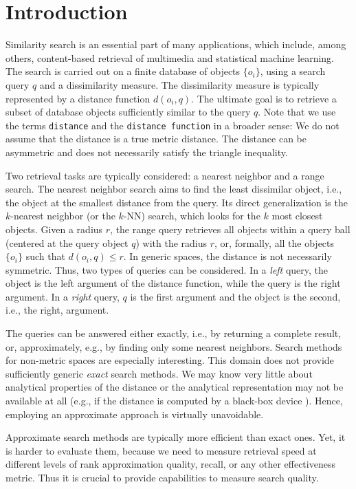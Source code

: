 \documentclass[runningheads,a4paper]{llncs}
\newcommand{\ttt}[1]{\texttt{#1}}
\newcommand{\knn}{$k$-NN}
\begin{document}
\section{Introduction}
Similarity search is an essential part of many applications,
which include, among others,  
content-based retrieval of multimedia  and statistical machine learning.
The search is carried out on a finite database of objects $\{o_i\}$,
using a search query $q$ and a dissimilarity measure.
The dissimilarity measure is typically represented by a distance function $d(o_i, q)$. 
The ultimate goal is to retrieve a subset of database objects sufficiently similar to the query $q$.
Note that we use the terms \ttt{distance} and the \ttt{distance function} in a broader sense:
We do not assume that the distance is a true metric distance. 
The distance can be asymmetric and does not necessarily satisfy the triangle inequality.

Two retrieval tasks are typically considered: a nearest neighbor and a range search. 
The nearest neighbor search aims to find the least dissimilar object,
i.e., the object at the smallest distance from the query.
Its direct generalization is the $k$-nearest neighbor (or the \knn) search,
which looks for the $k$ most closest objects.
Given a radius $r$, 
the range query retrieves all objects within a query ball (centered at the query object $q$) with the radius $r$,
or, formally, all the objects~$\lbrace o_i \rbrace$ such that $d(o_i, q) \le r$. 
In generic spaces, the distance is not necessarily symmetric. 
Thus, two types of queries can be considered. 
In a  \emph{left} query, the object is the left argument of the distance function,
while the query is the right argument.
In a \emph{right} query, $q$ is the first argument and the object is the second, i.e.,
the right, argument.

The queries can be answered either exactly, 
i.e., by returning a complete result, or, 
approximately, e.g., by finding only some nearest neighbors.
Search methods for non-metric spaces are especially interesting.
This domain does not provide sufficiently generic \emph{exact} search methods.
We may know very little about analytical properties of the distance
or the analytical representation may not be available at all (e.g., if the 
distance is computed by a black-box device \cite{Skopal:2007}).
Hence, employing an approximate approach is virtually unavoidable.

Approximate search methods are typically more efficient than exact ones.
Yet, it is harder to evaluate them,
because we need to measure retrieval speed at different levels of 
rank approximation quality, recall, or any other effectiveness metric.
Thus it is crucial to provide capabilities to measure search quality.
\end{document}
